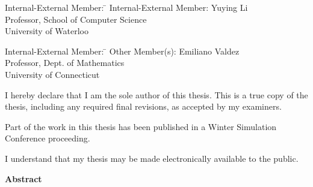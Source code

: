   \noindent
\begin{tabbing}
Internal-External Member: \=  \kill %
Internal-External Member: \> Yuying Li \\
\> Professor, School of Computer Science \\
\> University of Waterloo \\
\end{tabbing}
  \bigskip
  
  \noindent
\begin{tabbing}
Internal-External Member: \=  \kill %
Other Member(s): \>  Emiliano Valdez \\
\> Professor, Dept. of Mathematics \\
\> University of Connecticut \\
\end{tabbing}

\cleardoublepage

  \noindent
I hereby declare that I am the sole author of this thesis. This is a true copy of the thesis, including any required final revisions, as accepted by my examiners.

\bigskip
  
\noindent

Part of the work in this thesis has been published in a Winter Simulation Conference proceeding.

  \bigskip
  
  \noindent
I understand that my thesis may be made electronically available to the public.

\cleardoublepage


\begin{center}\textbf{Abstract}\end{center}

